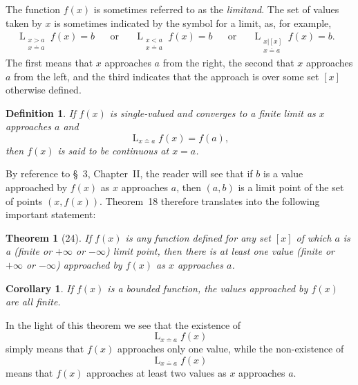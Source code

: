 \documentclass[a4paper,12pt]{book}[2004/02/16]
\providecommand{\hyperlink}[2]{#2}
\providecommand{\hypertarget}[2]{#2}
\theoremstyle{ilemma}
\theoremstyle{itheorem}
\newtheorem{theorem}{Theorem}
\theoremstyle{iother}
\theoremstyle{icorollary}
\newtheorem{corollary}{Corollary}
\theoremstyle{numcorollary}
\theoremstyle{idefinition}
\newtheorem*{definition}{Definition}
\begin{document}
The function $f(x)$ is sometimes referred to as the \emph{limitand}.
The set of values taken by $x$ is sometimes indicated by the symbol
for a limit, as, for example,
\begin{align*}
  \mathop{L}_{\substack{x>a \\x\doteq a}} f(x)=b &&\text{or}
&&\mathop{L}_{\substack{x<a \\x\doteq a}} f(x)=b &&\text{or}
&&\mathop{L}_{\substack{x|[x]\\x\doteq a}} f(x)=b. &
\end{align*}
The first means that $x$ approaches $a$ from the right, the second
that $x$ approaches $a$ from the left, and the third indicates that
the approach is over some set $[x]$ otherwise defined.

\begin{definition}\label{dp61}
If $f(x)$ is single-valued and converges to a finite limit as $x$
approaches $a$ and
\[
  \mathop{L}_{x\doteq a} f(x)=f(a),
\]
then $f(x)$ is said to be \emph{continuous} at $x=a$.
\end{definition}

By reference to \hyperlink{chIIsec3}{\S~3}, Chapter~\hyperlink{chapII}{II}, the reader will see that if $b$ is a
value approached by $f(x)$ as $x$ approaches $a$, then $(a, b)$ is a
limit point of the set of points $(x, f(x))$. Theorem~\hyperlink{thm18}{18} therefore
translates into the following important statement:

\begin{theorem}[24]\hypertarget{thm24}{}
If $f(x)$ is any function defined for any set $[x]$ of which $a$ is a
(finite or $+\infty$ or $-\infty$) limit point, then there is at least
one value (finite or $+\infty$ or $-\infty$) approached by $f(x)$ as
$x$ approaches $a$.
\end{theorem}

\begin{corollary}
If $f(x)$ is a bounded function, the values approached by $f(x)$ are
all finite.
\end{corollary}

In the light of this theorem we see that the existence of
\[
  \mathop{L}_{x\doteq a} f(x)
\]
simply means that $f(x)$ approaches only one value, while the
non-existence of
\[
  \mathop{L}_{x\doteq a} f(x)
\]
means that $f(x)$ approaches at least two values as $x$ approaches
$a$.
\end{document}
